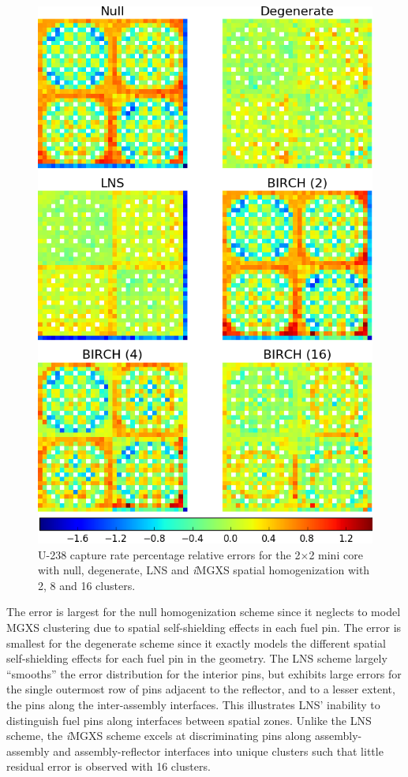 \documentclass[12pt,twoside]{mitthesis-exec}
\begin{document}
\begin{figure}[h!]
\centering
\includegraphics[width=0.83\linewidth]{figures/results/spatial/reflector/capt-err}
\vspace{2mm}
\caption[U-238 capture rate errors for the 2$\times$2 mini core]{U-238 capture rate percentage relative errors for the 2$\times$2 mini core with null, degenerate, LNS and \textit{i}MGXS spatial homogenization with 2, 8 and 16 clusters.}
\label{fig:refl-capt-err}
\end{figure}

The error is largest for the null homogenization scheme since it neglects to model MGXS clustering due to spatial self-shielding effects in each fuel pin. The error is smallest for the degenerate scheme since it exactly models the different spatial self-shielding effects for each fuel pin in the geometry. The LNS scheme largely ``smooths'' the error distribution for the interior pins, but exhibits large errors for the single outermost row of pins adjacent to the reflector, and to a lesser extent, the pins along the inter-assembly interfaces. This illustrates LNS' inability to distinguish fuel pins along interfaces between spatial zones. Unlike the LNS scheme, the \textit{i}MGXS scheme excels at discriminating pins along assembly-assembly and assembly-reflector interfaces into unique clusters such that little residual error is observed with 16 clusters.
\end{document}
